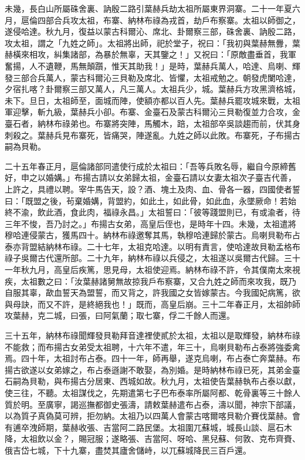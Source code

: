 \begin{pinyinscope}
未幾，長白山所屬硃舍裏、訥殷二路引葉赫兵劫太祖所屬東界洞寨。二十一年夏六月，扈倫四部合兵攻太祖，布寨、納林布祿為戎首，劫戶布察寨。太祖以師御之，遂侵哈達。秋九月，復益以蒙古科爾沁、席北、卦爾察三部，硃舍裏、訥殷二路，攻太祖，謂之「九姓之師」。太祖將出師，祀於堂子，祝曰：「我初與葉赫無釁，葉赫橫來相攻，糾集諸部，為暴於無辜，天其鑒之！」又祝曰：「原敵盡垂首，我軍奮揚，人不遺鞭，馬無顛躓，惟天其助我！」是時，葉赫兵萬人，哈達、烏喇、輝發三部合兵萬人，蒙古科爾沁三貝勒及席北、皆懼，太祖戒勉之。朝發虎闌哈達，夕宿扎喀？卦爾察三部又萬人，凡三萬人。太祖兵少，城。葉赫兵方攻黑濟格城，未下。旦日，太祖師至，面城而陣，使額亦都以百人先。葉赫兵罷攻城來戰，太祖軍迎擊，斬九級，葉赫兵小卻。布寨、金臺石及蒙古科爾沁三貝勒復並力合攻，金臺石者，納林布祿弟也。布寨將突陣，馬觸木，踣，太祖部卒吳談趨而前，伏其身刺殺之。葉赫兵見布寨死，皆痛哭，陣遂亂。九姓之師以此敗。布寨死，子布揚古嗣為貝勒。

二十五年春正月，扈倫諸部同遣使行成於太祖曰：「吾等兵敗名辱，繼自今原締舊好，申之以婚媾。」布揚古請以女弟歸太祖，金臺石請以女妻太祖次子臺吉代善，上許之，具禮以聘。宰牛馬告天，設？酒、塊土及肉、血、骨各一器，四國使者誓曰：「既盟之後，茍棄婚媾，背盟約，如此土，如此骨，如此血，永墜厥命！若始終不渝，飲此酒，食此肉，福祿永昌。」太祖誓曰：「彼等踐盟則已，有或渝者，待三年不悛，吾乃討之。」布揚古女弟，高皇后侄也，是時年十四。未幾，太祖遣將穆哈連侵蒙古，獲馬四十。納林布祿邀奪其馬，執穆哈連歸於蒙古。烏喇貝勒布占泰亦背盟結納林布祿。二十七年，太祖克哈達。以明有責言，使哈達故貝勒孟格布祿子吳爾古代還所部。二十九年，納林布祿以兵侵之，太祖遂以吳爾古代歸。三十一年秋九月，高皇后疾篤，思見母，太祖使迎焉。納林布祿不許，令其僕南太來視疾，太祖數之曰：「汝葉赫諸舅無故掠我戶布察寨，又合九姓之師而來攻我，既乃自服其辜，歃血誓天為盟誓，而又背之，許我國之女皆嫁蒙古。今我國妃病篤，欲與母訣，而又不許，是終絕我也！」既而，高皇后崩。三十二年春正月，太祖帥師攻葉赫，克二城，曰張，曰阿氣蘭；取七寨，俘二千餘人而還。

三十五年，納林布祿聞輝發貝勒拜音達裡使貳於太祖，太祖以是取輝發，納林布祿不能救；而布揚古女弟受太祖聘，十六年不遣，年三十，烏喇貝勒布占泰將強委禽焉。四十年，太祖討布占泰。四十一年，師再舉，遂克烏喇，布占泰亡奔葉赫。布揚古欲遂以女弟嫁之，布占泰遜謝不敢娶，為別婚。是時納林布祿已死，其弟金臺石嗣為貝勒，與布揚古分居東、西城如故。秋九月，太祖使告葉赫執布占泰以獻，使三往，不聽。太祖謀伐之，先期遣第七子巴布泰率所屬阿都、乾骨裏等三十餘人質於明。至廣寧，謁巡撫都御史張濤，請敕葉赫遣布占泰，濤以聞，神宗下部議，以為質子真偽莫可辨，拒勿納。太祖乃以四萬人會蒙古喀爾喀貝勒介賽伐葉赫。會有逋卒洩師期，葉赫收張、吉當阿二路民堡。太祖圍兀蘇城，城長山談、扈石木降，太祖飲以金？，賜冠服；遂略張、吉當阿、呀哈、黑兒蘇、何敦、克布齊賚、俄吉岱七城，下十九寨，盡焚其廬舍儲峙，以兀蘇城降民三百戶還。


\end{pinyinscope}
